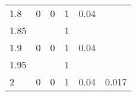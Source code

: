 \begin{center}
\begin{tabular}{llllll}
1.8          & 0            & 0             & 1                           & 0.04           \\
1.85         &              &               & 1                         &                \\
1.9          & 0            & 0             & 1                           & 0.04           \\
1.95         &              &               & 1                            &                \\
2            & 0            & 0             & 1                          & 0.04      & 0.017    
\end{tabular}
\end{center}